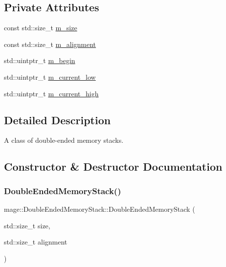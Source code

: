 \subsection*{Private Attributes}
\begin{DoxyCompactItemize}
\item 
const std\+::size\+\_\+t \mbox{\hyperlink{classmage_1_1_double_ended_memory_stack_a6c7017157bb4effd865b22be0630f9c2}{m\+\_\+size}}
\item 
const std\+::size\+\_\+t \mbox{\hyperlink{classmage_1_1_double_ended_memory_stack_ac3a3edb2974842b2423d910eceebaf2e}{m\+\_\+alignment}}
\item 
std\+::uintptr\+\_\+t \mbox{\hyperlink{classmage_1_1_double_ended_memory_stack_a27eccabebcf57a9d292f0479668521af}{m\+\_\+begin}}
\item 
std\+::uintptr\+\_\+t \mbox{\hyperlink{classmage_1_1_double_ended_memory_stack_a183fae9f5c62fa8541884d3368696217}{m\+\_\+current\+\_\+low}}
\item 
std\+::uintptr\+\_\+t \mbox{\hyperlink{classmage_1_1_double_ended_memory_stack_a66eab8fc68afc7c60c5efdc90f3f59b4}{m\+\_\+current\+\_\+high}}
\end{DoxyCompactItemize}


\subsection{Detailed Description}
A class of double-\/ended memory stacks. 

\subsection{Constructor \& Destructor Documentation}
\mbox{\label{classmage_1_1_double_ended_memory_stack_a6523e21851c5a87e486d342d5e3b64d8}} 
\subsubsection{\texorpdfstring{Double\+Ended\+Memory\+Stack()}{DoubleEndedMemoryStack()}\hspace{0.1cm}{\footnotesize\ttfamily [1/3]}}
{\footnotesize\ttfamily mage\+::\+Double\+Ended\+Memory\+Stack\+::\+Double\+Ended\+Memory\+Stack (\begin{DoxyParamCaption}\item[{std\+::size\+\_\+t}]{size,  }\item[{std\+::size\+\_\+t}]{alignment }\end{DoxyParamCaption})\hspace{0.3cm}{\ttfamily [explicit]}}

